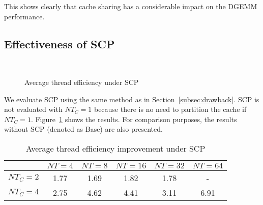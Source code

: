 This shows clearly that cache sharing has a considerable
impact on the DGEMM performance. 

\subsection{Effectiveness of SCP}\label{subsec:benefit}

\begin{figure}
  \centering
  \\
  \caption{Average thread efficiency under SCP}
  \label{fig:benefit}
\end{figure}

We evaluate SCP using the same method as in Section~\ref{subsec:drawback}.
SCP is not evaluated with $NT_C=1$ because there is no need
to partition the cache if $NT_C=1$.
Figure~\ref{fig:benefit} shows the results.
For comparison purposes, the results without SCP
(denoted as Base) are also presented.

\begin{table}
  \centering
  \caption{Average thread efficiency improvement under SCP}
  \label{tab:win}
  \setlength{\tabcolsep}{3.5pt}
  \begin{tabular}{cccccc}
    \toprule
     & $NT=4$ & $NT=8$ & $NT=16$ & $NT=32$ & $NT=64$ \\
    \midrule
    $NT_C=2$ & 1.77 & 1.69 & 1.82 & 1.78 & - \\
    $NT_C=4$ & 2.75 & 4.62 & 4.41 & 3.11 & 6.91 \\
    \bottomrule
  \end{tabular}
\end{table}


